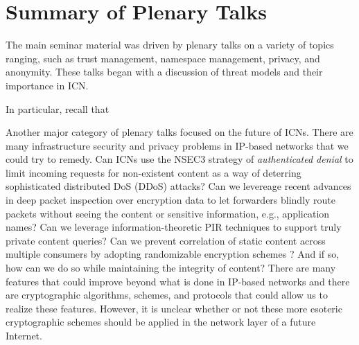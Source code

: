 \section{Summary of Plenary Talks} \label{sec:plenary-talks}
The main seminar material was driven by plenary talks on a variety of topics
ranging, such as trust management, namespace management, privacy, and anonymity.
These talks began with a discussion of threat models and their importance in ICN.


In particular, recall that



Another major category of plenary talks focused on the future of ICNs. There are many infrastructure
security and privacy problems in IP-based networks that we could try to remedy.
Can ICNs use the NSEC3 strategy of \emph{authenticated denial} \cite{blacka2008dns} to limit incoming requests
for non-existent content as a way of deterring sophisticated distributed DoS (DDoS) attacks?
Can we levereage recent advances in deep packet inspection over encryption data \cite{sherry2015blindbox}
to let forwarders blindly route packets without seeing the content or sensitive information,
e.g., application names? Can we leverage information-theoretic PIR techniques \cite{pir-icn} to support
truly private content queries? Can we prevent correlation
of static content across multiple consumers by adopting randomizable encryption schemes \cite{blazy2011signatures}?
And if so, how can we do so while maintaining the integrity of content? There are many
features that could improve beyond what is done in IP-based networks and there are cryptographic
algorithms, schemes, and protocols that could allow us to realize these features. However,
it is unclear whether or not these more esoteric cryptographic schemes should be applied in
the network layer of a future Internet.


